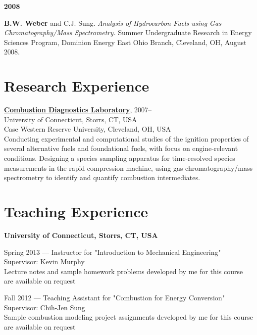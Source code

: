 \begin{bibsection}
\item[] \textbf{2008}
\item[] \textbf{ B.W. Weber} and C.J. Sung. \textit{Analysis of
        Hydrocarbon Fuels using Gas Chromatography/Mass Spectrometry.}
        Summer Undergraduate Research in Energy Sciences Program,
        Dominion Energy East Ohio Branch, Cleveland, OH, August 2008.
\end{bibsection}

\vspace{0.1in}

\section{{\sectionfont Research Experience}}

\href{http://combdiaglab.engr.uconn.edu}
{\textbf{Combustion Diagnostics Laboratory}}, 2007--\\
University of Connecticut, Storrs, CT, USA\\
Case Western Reserve University, Cleveland, OH, USA\\

Conducting experimental and computational studies of the ignition
properties of several alternative fuels and foundational fuels, with
focus on engine-relevant conditions.
Designing a species sampling apparatus for time-resolved
species measurements in the rapid compression machine, using gas
chromatography/mass spectrometry to identify and quantify
combustion intermediates.

\section{{\sectionfont Teaching Experience}}

\textbf{University of Connecticut, Storrs, CT, USA}

\vspace{\baselineskip}

Spring 2013 --- Instructor for "Introduction to Mechanical Engineering"\\
Supervisor: Kevin Murphy\\
Lecture notes and sample homework problems developed by me for this course
are available on request

\vspace{\baselineskip}

Fall 2012 --- Teaching Assistant for "Combustion for Energy Conversion"\\
Supervisor: Chih-Jen Sung\\
Sample combustion modeling project assignments developed by me for this
course are available on request

